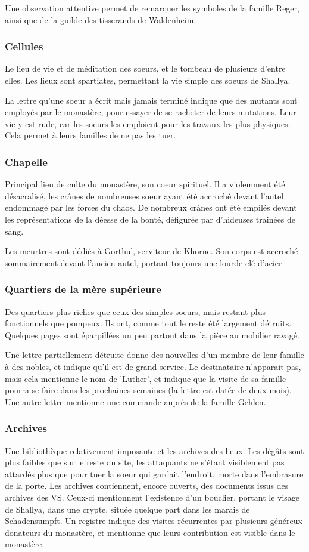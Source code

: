 \documentclass[10pt,a4paper]{book}
\begin{document}
Une observation attentive permet de remarquer les symboles de la famille Reger, ainsi que de la guilde des tisserands de Waldenheim.
\subsubsection{Cellules}
Le lieu de vie et de méditation des soeurs, et le tombeau de plusieurs d'entre elles. Les lieux sont spartiates, permettant la vie simple des soeurs de Shallya. 

La lettre qu'une soeur a écrit mais jamais terminé indique que des mutants sont employés par le monastère, pour essayer de se racheter de leurs mutations. Leur vie y est rude, car les soeurs les emploient pour les travaux les plus physiques. Cela permet à leurs familles de ne pas les tuer.
\subsubsection{Chapelle}
Principal lieu de culte du monastère, son coeur spirituel. Il a violemment été désacralisé, les crânes de nombreuses soeur ayant été accroché devant l'autel endommagé par les forces du chaos. De nombreux crânes ont été empilés devant les représentations de la déesse de la bonté, défigurée par d'hideuses trainées de sang.

Les meurtres sont dédiés à Gorthul, serviteur de Khorne. Son corps est accroché sommairement devant l'ancien autel, portant toujours une lourde clé d'acier.
\subsubsection{Quartiers de la mère supérieure}
Des quartiers plus riches que ceux des simples soeurs, mais restant plus fonctionnels que pompeux. Ils ont, comme tout le reste été largement détruits. Quelques pages sont éparpillées un peu partout dans la pièce au mobilier ravagé.

Une lettre partiellement détruite donne des nouvelles d'un membre de leur famille à des nobles, et indique qu'il est de grand service. Le destinataire n'apparait pas, mais cela mentionne le nom de 'Luther', et indique que la visite de sa famille pourra se faire dans les prochaines semaines (la lettre est datée de deux mois). Une autre lettre mentionne une commande auprès de la famille Gehlen.
\subsubsection{Archives}
Une bibliothèque relativement imposante et les archives des lieux. Les dégâts sont plus faibles que sur le reste du site, les attaquants ne s'étant visiblement pas attardés plus que pour tuer la soeur qui gardait l'endroit, morte dans l'embrasure de la porte.
Les archives contiennent, encore ouverts, des documents issus des archives des VS. Ceux-ci mentionnent l'existence d'un bouclier, portant le visage de Shallya, dans une crypte, située quelque part dans les marais de Schadensumpft. Un registre indique des visites récurrentes par plusieurs généreux donateurs du monastère, et mentionne que leurs contribution est visible dans le monastère.
\end{document}
